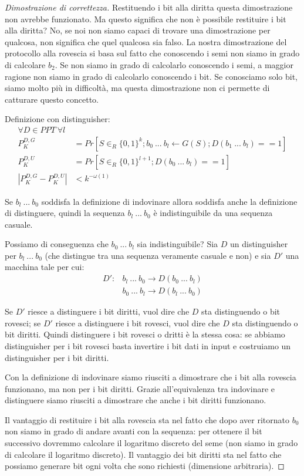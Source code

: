 \begin{proof}[Dimostrazione di correttezza]
    Restituendo i bit alla diritta questa dimostrazione non avrebbe funzionato. Ma questo significa che non è possibile restituire i bit alla diritta? No, se noi non siamo capaci di trovare una dimostrazione per qualcosa, non significa che quel qualcosa sia falso. La nostra dimostrazione del protocollo alla rovescia si basa sul fatto che conoscendo i semi non siamo in grado di calcolare $b_2$. Se non siamo in grado di calcolarlo conoscendo i semi, a maggior ragione non siamo in grado di calcolarlo conoscendo i bit. Se conosciamo solo bit, siamo molto più in difficoltà, ma questa dimostrazione non ci permette di catturare questo concetto. 


    Definizione con distinguisher:
    \begin{align*}
        \forall D \in PPT \ \forall l&\\
        P_K^{D, G} &= Pr[S \in_R \{0, 1\}^k; b_0 \ ... \ b_l \leftarrow G(S); D(b_1 \ ... \ b_l) == 1]\\
        P_K^{D, U} &= Pr[S \in_R \{0, 1\}^{l+1}; D(b_0 \ ... \ b_l) == 1]\\
        \left|P_K^{D, G} - P_K^{D, U}\right| &< k^{-\omega(1)}
    \end{align*}



    \noindent Se $b_l \ ... \ b_0$ soddisfa la definizione di indovinare allora soddisfa anche la definizione di distinguere, quindi la sequenza $b_l \ ... \ b_0$ è indistinguibile da una sequenza casuale. 

    Possiamo di conseguenza che $b_0 \ ... \ b_l$ sia indistinguibile? Sia $D$ un distinguisher per $b_l \ ... \ b_0$ (che distingue tra una sequenza veramente casuale e non) e sia $D'$ una macchina tale per cui:
    \begin{align*}
        D' :& b_l \ ... \ b_0 \rightarrow D(b_0 \ ... \ b_l)\\
            & b_0 \ ... \ b_l \rightarrow D(b_l \ ... \ b_0)
    \end{align*}

    \noindent Se $D'$ riesce a distinguere i bit diritti, vuol dire che $D$ sta distinguendo o bit rovesci; se $D'$ riesce a distinguere i bit rovesci, vuol dire che $D$ sta distinguendo o bit diritti. Quindi distinguere i bit rovesci o dritti è la stessa cosa: se abbiamo distinguisher per i bit rovesci basta invertire i bit dati in input e costruiamo un distinguisher per i bit diritti.

    Con la definizione di indovinare siamo riusciti a dimostrare che i bit alla rovescia funzionano, ma non per i bit diritti. Grazie all'equivalenza tra indovinare e distinguere siamo riusciti a dimostrare che anche i bit diritti funzionano.

    Il vantaggio di restituire i bit alla rovescia sta nel fatto che dopo aver ritornato $b_0$ non siamo in grado di andare avanti con la sequenza: per ottenere il bit successivo dovremmo calcolare il logaritmo discreto del seme (non siamo in grado di calcolare il logaritmo discreto). Il vantaggio dei bit diritti sta nel fatto che possiamo generare bit ogni volta che sono richiesti (dimensione arbitraria).
\end{proof} 

